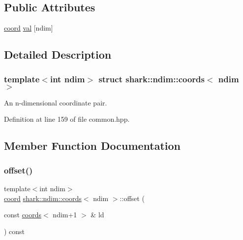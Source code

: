 \subsection*{Public Attributes}
\begin{DoxyCompactItemize}
\item 
\hyperlink{namespaceshark_a767a92d5dd82cb82266473bff42fa6d9}{coord} \hyperlink{structshark_1_1ndim_1_1coords_a425262af388367b0f0079218e038aef5}{val} \mbox{[}ndim\mbox{]}
\end{DoxyCompactItemize}


\subsection{Detailed Description}
\subsubsection*{template$<$int ndim$>$\newline
struct shark\+::ndim\+::coords$<$ ndim $>$}

An n-\/dimensional coordinate pair. 

Definition at line 159 of file common.\+hpp.



\subsection{Member Function Documentation}
\hypertarget{structshark_1_1ndim_1_1coords_a0c905dc9ae7a2ea1c3a8cd4aaf542d73}{}\label{structshark_1_1ndim_1_1coords_a0c905dc9ae7a2ea1c3a8cd4aaf542d73} 
\subsubsection{\texorpdfstring{offset()}{offset()}\hspace{0.1cm}{\footnotesize\ttfamily [1/2]}}
{\footnotesize\ttfamily template$<$int ndim$>$ \\
\hyperlink{namespaceshark_a767a92d5dd82cb82266473bff42fa6d9}{coord} \hyperlink{structshark_1_1ndim_1_1coords}{shark\+::ndim\+::coords}$<$ ndim $>$\+::offset (\begin{DoxyParamCaption}\item[{const \hyperlink{structshark_1_1ndim_1_1coords}{coords}$<$ ndim+1 $>$ \&}]{ld }\end{DoxyParamCaption}) const\hspace{0.3cm}{\ttfamily [inline]}}



